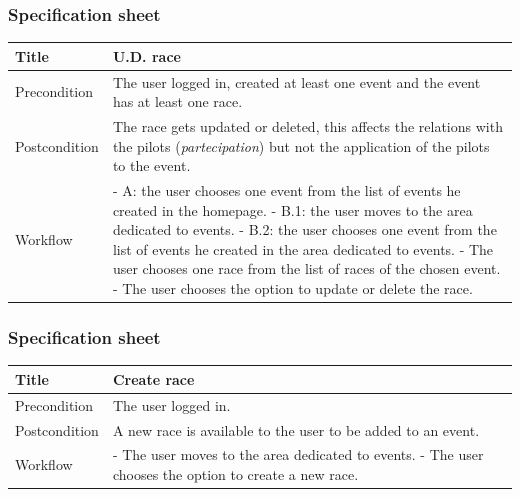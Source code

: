 \documentclass{beamer}
\begin{document}
\begin{frame}
    \frametitle{Specification sheet}
    \begin{table}
        \tiny
        \begin{tabular}{|p{2cm}|p{6cm}|}
        \hline
        Title & \textbf{U.D. race} \\
        \hline
        Precondition & The user logged in, created at least one event and the event has at least one race. \\
        \hline
        Postcondition & The race gets updated or deleted, this affects the relations with the pilots (\textit{partecipation})
        but not the application of the pilots to the event. \\
        \hline
        Workflow &
        - A: the user chooses one event from the list of events he created in the homepage. \newline
        - B.1: the user moves to the area dedicated to events. \newline
        - B.2: the user chooses one event from the list of events he created in the area dedicated to events. \newline
        - The user chooses one race from the list of races of the chosen event. \newline
        - The user chooses the option to update or delete the race. \\
        \hline
        \end{tabular}
\end{table}
\end{frame}

\begin{frame}
    \frametitle{Specification sheet}
    \begin{table}
        \tiny
        \begin{tabular}{|p{2cm}|p{6cm}|}
        \hline
        Title & \textbf{Create race} \\
        \hline
        Precondition & The user logged in. \\
        \hline
        Postcondition & A new race is available to the user to be added to an event. \\
        \hline
        Workflow &
        - The user moves to the area dedicated to events. \newline
        - The user chooses the option to create a new race. \\
        \hline
        \end{tabular}
\end{table}
\end{frame}
\end{document}
